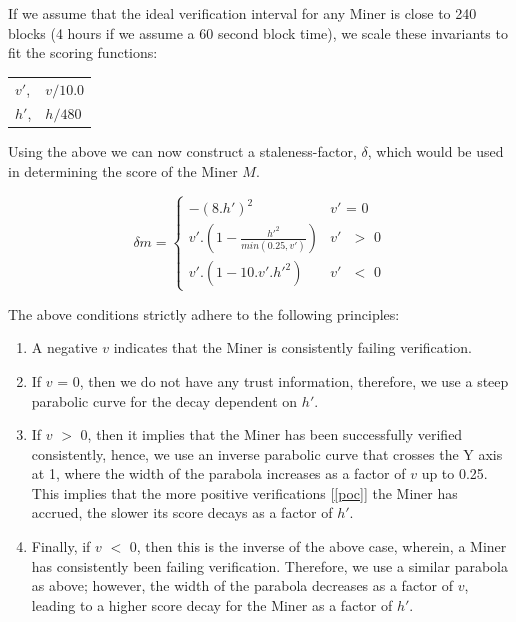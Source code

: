 \documentclass[10pt, nonatbib, nocopyrightspace, reprint]{sigplanconf}
\newcommand{\secref}[1]{[\autoref{#1}]}
\begin{document}
If we assume that the ideal verification interval for any Miner is close to 240 blocks (4 hours if we assume a 60 second block time), we scale these invariants to fit the scoring functions:

\begin{tabular}{l l}
        $v'$, &$v/10.0$\\
        $h'$, &$h/480$ \\
\end{tabular}

Using the above we can now construct a staleness-factor, $\delta$, which would be used in determining the score of the Miner $M$.

\begin{equation*} \label{eq:equation:score1}
        \delta{m} = \begin{cases}
        	-(8.h')^{2}&\text{$v'$ = 0}\\
        	v'.(1 - \frac{h'^{2}}{min(0.25, v')})&\text{$v'$ $>$ 0}\\
        	v'.(1 - 10.v'.h'^{2})&\text{$v'$ $<$ 0}
        \end{cases}
\end{equation*}

The above conditions strictly adhere to the following principles:

\begin{enumerate}
  \item A negative $v$ indicates that the Miner is consistently failing verification.

  \item If $v$ = 0, then we do not have any trust information, therefore, we use a steep parabolic curve for the decay dependent on $h'$.

  \item If $v$ $>$ 0, then it implies that the Miner has been successfully verified consistently, hence, we use an inverse parabolic curve that crosses the Y axis at 1, where the width of the parabola increases as a factor of $v$ up to 0.25. This implies that the more positive verifications \secref{poc} the Miner has accrued, the slower its score decays as a factor of $h'$.

  \item Finally, if $v$ $<$ 0, then this is the inverse of the above case, wherein, a Miner has consistently been failing verification. Therefore, we use a similar parabola as above; however, the width of the parabola decreases as a factor of $v$, leading to a higher score decay for the Miner as a factor of $h'$.

\end{enumerate}
\end{document}
